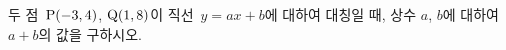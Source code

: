 두 점~$\mathrm{P}(-3{,}\mkern3mu\mathopen{}4)$, $\mathrm{Q}(1{,}\mkern3mu\mathopen{}8)$이 직선~$y=ax+b$에 대하여 대칭일 때, 상수 $a$, $b$에 대하여 $a+b$의 값을 구하시오.
